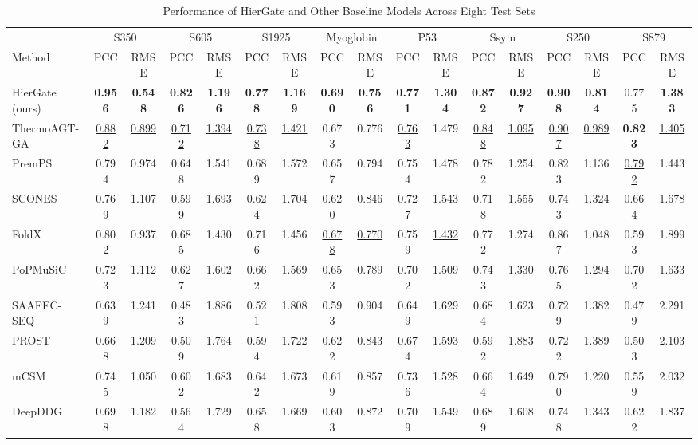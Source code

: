 \documentclass[journal,twoside,web]{ieeecolor}
\begin{document}
\begin{table}[!t]
\footnotesize
\setlength{\tabcolsep}{3pt}
\caption{Performance of HierGate and Other Baseline Models Across Eight Test Sets}
\label{tab:perf}
\begin{tabular*}{\textwidth}{@{\extracolsep{\fill}}lcccccccccccccccc}
\toprule
& \multicolumn{2}{c}{S350} & \multicolumn{2}{c}{S605} & \multicolumn{2}{c}{S1925} & \multicolumn{2}{c}{Myoglobin}
& \multicolumn{2}{c}{P53} & \multicolumn{2}{c}{Ssym} & \multicolumn{2}{c}{S250} & \multicolumn{2}{c}{S879} \\
\cmidrule(lr){2-3} \cmidrule(lr){4-5} \cmidrule(lr){6-7} \cmidrule(lr){8-9}
\cmidrule(lr){10-11} \cmidrule(lr){12-13} \cmidrule(lr){14-15} \cmidrule(lr){16-17}
Method & PCC & RMSE & PCC & RMSE & PCC & RMSE & PCC & RMSE
      & PCC & RMSE & PCC & RMSE & PCC & RMSE & PCC & RMSE \\
\midrule
HierGate (ours)      & \textbf{0.956} & \textbf{0.548} & \textbf{0.826} & \textbf{1.196} & \textbf{0.778} & \textbf{1.169} & \textbf{0.690} & \textbf{0.756}
              & \textbf{0.771} & \textbf{1.304} & \textbf{0.872} & \textbf{0.927} & \textbf{0.908} & \textbf{0.814} & 0.775 & \textbf{1.383} \\
ThermoAGT-GA  & \underline{0.882} & \underline{0.899} & \underline{0.712} & \underline{1.394} & \underline{0.738} & \underline{1.421} & 0.673 & 0.776
              & \underline{0.763} & 1.479 & \underline{0.848} & \underline{1.095} & \underline{0.907} & \underline{0.989} & \textbf{0.823} & \underline{1.405} \\
PremPS        & 0.794 & 0.974 & 0.648 & 1.541 & 0.689 & 1.572 & 0.657 & 0.794
              & 0.754 & 1.478 & 0.782 & 1.254 & 0.823 & 1.136 & \underline{0.792} & 1.443 \\
SCONES        & 0.769 & 1.107 & 0.599 & 1.693 & 0.624 & 1.704 & 0.620 & 0.846
              & 0.727 & 1.543 & 0.718 & 1.555 & 0.743 & 1.324 & 0.664 & 1.678 \\
FoldX         & 0.802 & 0.937 & 0.685 & 1.430 & 0.716 & 1.456 & \underline{0.678} & \underline{0.770}
              & 0.759 & \underline{1.432} & 0.772 & 1.274 & 0.867 & 1.048 & 0.593 & 1.899 \\
PoPMuSiC      & 0.723 & 1.112 & 0.627 & 1.602 & 0.662 & 1.569 & 0.653 & 0.789
              & 0.702 & 1.509 & 0.743 & 1.330 & 0.765 & 1.294 & 0.702 & 1.633 \\
SAAFEC-SEQ    & 0.639 & 1.241 & 0.483 & 1.886 & 0.521 & 1.808 & 0.593 & 0.904
              & 0.649 & 1.629 & 0.684 & 1.623 & 0.729 & 1.382 & 0.479 & 2.291 \\
PROST         & 0.668 & 1.209 & 0.509 & 1.764 & 0.594 & 1.722 & 0.622 & 0.843
              & 0.674 & 1.593 & 0.592 & 1.883 & 0.722 & 1.389 & 0.503 & 2.103 \\
mCSM          & 0.745 & 1.050 & 0.602 & 1.683 & 0.642 & 1.673 & 0.619 & 0.857
              & 0.736 & 1.528 & 0.664 & 1.649 & 0.790 & 1.220 & 0.559 & 2.032 \\
DeepDDG       & 0.698 & 1.182 & 0.564 & 1.729 & 0.658 & 1.669 & 0.603 & 0.872
              & 0.709 & 1.549 & 0.689 & 1.608 & 0.748 & 1.343 & 0.622 & 1.837 \\
\bottomrule
\end{tabular*}
\smallskip


\end{table}
\end{document}
